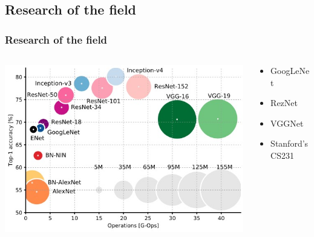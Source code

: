 \documentclass{beamer}
\begin{document}
\subsection{Research of the field}
\begin{frame}
  \frametitle{Research of the field}
  \begin{columns}[T]
    \begin{column}{.5\textwidth}
      \begin{block}{}
        \begin{minipage}[c][0.5\textheight][c]{\linewidth}
          \includegraphics[width=\textwidth]{images/graph_cnns.jpg}
        \end{minipage}
      \end{block}
    \end{column}
    \begin{column}{.5\textwidth}
      \begin{block}{}
        \begin{minipage}[c][0.5\textheight][c]{\linewidth}
          \begin{itemize}
            \item GoogLeNet
            \item RezNet
            \item VGGNet
            \item Stanford's CS231
          \end{itemize}
        \end{minipage}
      \end{block}
    \end{column}
  \end{columns}
\end{frame}
\end{document}

